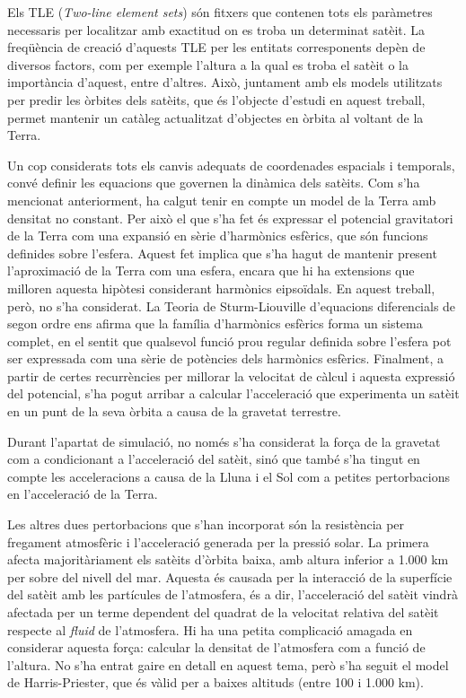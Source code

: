 \documentclass{article}
\begin{document}
Els TLE (\emph{Two-line element sets}) són fitxers que contenen tots els paràmetres necessaris per localitzar amb exactitud on es troba un determinat satè\lgem it. La freqüència de creació d'aquests TLE per les entitats corresponents depèn de diversos factors, com per exemple l'altura a la qual es troba el satè\lgem it o la importància d'aquest, entre d'altres. Això, juntament amb els models utilitzats per predir les òrbites dels satè\lgem its, que és l'objecte d'estudi en aquest treball, permet mantenir un catàleg actualitzat d'objectes en òrbita al voltant de la Terra.

Un cop considerats tots els canvis adequats de coordenades espacials i temporals, convé definir les equacions que governen la dinàmica dels satè\lgem its. Com s'ha mencionat anteriorment, ha calgut tenir en compte un model de la Terra amb densitat no constant. Per això el que s'ha fet és expressar el potencial gravitatori de la Terra com una expansió en sèrie d'harmònics esfèrics, que són funcions definides sobre l'esfera. Aquest fet implica que s'ha hagut de mantenir present l'aproximació de la Terra com una esfera, encara que hi ha extensions que milloren aquesta hipòtesi considerant harmònics e\lgem ipsoïdals. En aquest treball, però, no s'ha  considerat. La Teoria de Sturm-Liouville d'equacions diferencials de segon ordre ens afirma que la família d'harmònics esfèrics forma un sistema complet, en el sentit que qualsevol funció prou regular definida sobre l'esfera pot ser expressada com una sèrie de potències dels harmònics esfèrics. Finalment, a partir de certes recurrències per millorar la velocitat de càlcul i aquesta expressió del potencial, s'ha pogut arribar a calcular l'acceleració que experimenta un satè\lgem it en un punt de la seva òrbita a causa de la gravetat terrestre.

Durant l'apartat de simulació, no només s'ha considerat la força de la gravetat com a condicionant a l'acceleració del satè\lgem it, sinó que també s'ha tingut en compte les acceleracions a causa de la Lluna i el Sol com a petites pertorbacions en l'acceleració de la Terra.

Les altres dues pertorbacions que s'han incorporat són la resistència per fregament atmosfèric i l'acceleració generada per la pressió solar. La primera afecta majoritàriament els satè\lgem its d'òrbita baixa, amb altura inferior a 1.000 km per sobre del nivell del mar. Aquesta és causada per la interacció de la superfície del satè\lgem it amb les partícules de l'atmosfera, és a dir, l'acceleració del satè\lgem it vindrà afectada per un terme dependent del quadrat de la velocitat relativa del satè\lgem it respecte al \emph{fluid} de l'atmosfera. Hi ha una petita complicació amagada en considerar aquesta força: calcular la densitat de l'atmosfera com a funció de l'altura. No s'ha entrat gaire en detall en aquest tema, però s'ha seguit el model de Harris-Priester, que és vàlid per a baixes altituds (entre 100 i 1.000 km).
\end{document}

